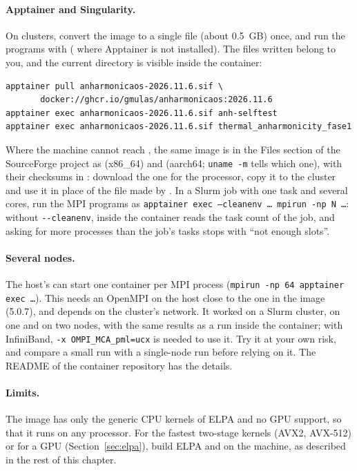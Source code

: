 \paragraph{Apptainer and Singularity.} On clusters, convert the image to
a single  file (about 0.5~GB) once, and run the programs with
 ( where Apptainer is not
installed). The files written belong to you, and the current directory is
visible inside the container:
\begin{verbatim}
apptainer pull anharmonicaos-2026.11.6.sif \
       docker://ghcr.io/gmulas/anharmonicaos:2026.11.6
apptainer exec anharmonicaos-2026.11.6.sif anh-selftest
apptainer exec anharmonicaos-2026.11.6.sif thermal_anharmonicity_fase1
\end{verbatim}
Where the machine cannot reach , the same image is in the
Files section of the SourceForge project as
 (x86\_64) and
 (aarch64; \texttt{uname -m}
tells which one), with their checksums in \file{SHA256SUMS}: download the
one for the processor, copy it to the cluster and use it in place of the
file made by \prog{apptainer pull}.
In a Slurm job with one task and several cores, run the MPI programs as
\texttt{apptainer exec --cleanenv \ldots{} mpirun -np N \ldots}:
without \texttt{-{}-cleanenv}, \prog{mpirun} inside the container reads the
task count of the job, and asking for more processes than the job's tasks
stops with ``not enough slots''.

\paragraph{Several nodes.} The host's  can start one container
per MPI process (\texttt{mpirun -np 64 apptainer exec \ldots}). This
needs an OpenMPI on the host close to the one in the image (5.0.7), and
depends on the cluster's network. It worked on a Slurm cluster, on one
and on two nodes, with the same results as a run inside the container;
with InfiniBand, \texttt{-x OMPI\_MCA\_pml=ucx} is needed to use it. Try it
at your own risk, and compare a small run with a single-node run before
relying on it. The README of the container repository has the details.

\paragraph{Limits.} The image has only the generic CPU kernels of ELPA and
no GPU support, so that it runs on any processor. For the fastest
two-stage kernels (AVX2, AVX-512) or for a GPU (Section~\ref{sec:elpa}),
build ELPA and \ac{} on the machine, as described in the rest of this
chapter.

